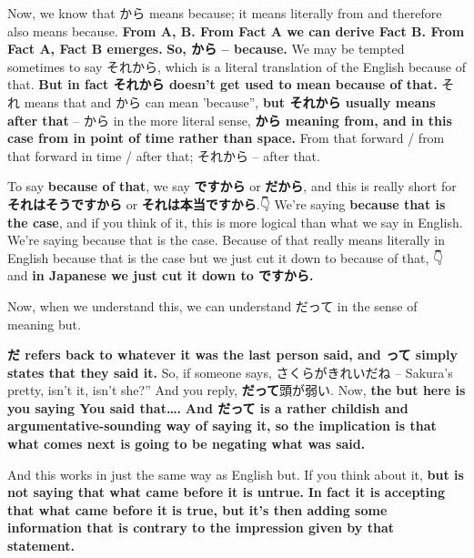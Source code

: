 {}

Now, we know that から means because; it means literally from and therefore also means because. {\bf From A, B. From Fact A we can derive Fact B. From Fact A, Fact B emerges.} {\bf So, から -- because.} We may be tempted sometimes to say それから, which is a literal translation of the English because of that. {\bf But in fact それから doesn't get used to mean because of that.} それ means that and から can mean 'because”, {\bf but それから usually means after that} -- から in the more literal sense, {\bf から meaning from, and in this case from in point of time rather than space.} From that forward / from that forward in time / after that; それから -- after that.

\thinrule

To say {\bf because of that}, we say {\bf ですから} or {\bf だから}, and this is really short for {\bf それはそうですから} or {\bf それは本当ですから}.👇 We're saying {\bf because that is the case}, and if you think of it, this is more logical than what we say in English. We're saying because that is the case. Because of that really means literally in English because that is the case but we just cut it down to because of that, 👇 and {\bf in Japanese we just cut it down to ですから.}

\stopsectionlevel

\startsectionlevel[title={Back to だって as but},reference={back-to-だって-as-but}]

Now, when we understand this, we can understand だって in the sense of meaning but.

{}

{\bf だ refers back to whatever it was the last person said, and って simply states that they said it.} So, if someone says, さくらがきれいだね -- Sakura's pretty, isn't it, isn't she?” And you reply, {\bf だって}頭が弱い. Now, {\bf the but here is you saying You said that\ldots{}.} {\bf And だって is a rather childish and argumentative-sounding way of saying it, so the implication is that what comes next is going to be negating what was said.}

\thinrule

And this works in just the same way as English but. If you think about it, {\bf but is not saying that what came before it is untrue.} {\bf In fact it is accepting that what came before it is true, but it's then adding some information that is contrary to the impression given by that statement.}

